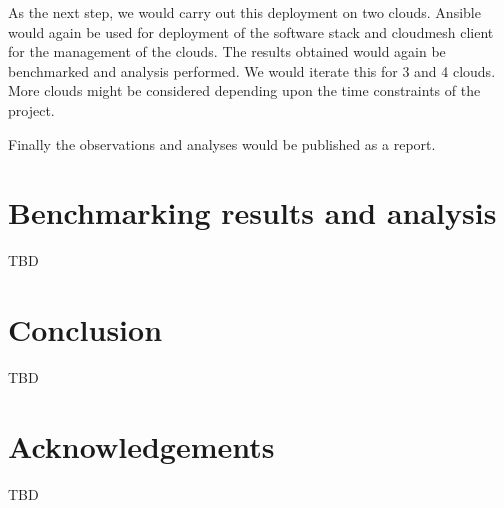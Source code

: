 \documentclass[9pt,twocolumn,twoside]{../../styles/osajnl}
\begin{document}
As the next step, we would carry out this deployment on two clouds.
Ansible would again be used for deployment of the software stack and
cloudmesh client for the management of the clouds.  The results
obtained would again be benchmarked and analysis performed.  We would
iterate this for 3 and 4 clouds.  More clouds might be considered
depending upon the time constraints of the project.

Finally the observations and analyses would be published as a report.

\section{Benchmarking results and analysis}
TBD

\section{Conclusion}
TBD

\section{Acknowledgements}
TBD


\end{document}
